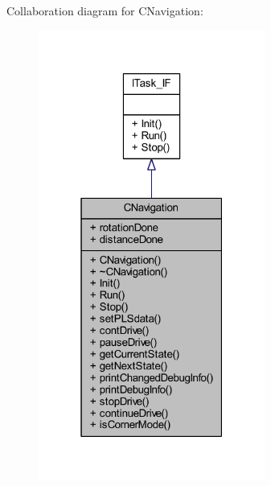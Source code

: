 Collaboration diagram for C\+Navigation\+:
\nopagebreak
\begin{figure}[H]
\begin{center}
\leavevmode
\includegraphics[width=211pt]{class_c_navigation__coll__graph}
\end{center}
\end{figure}
